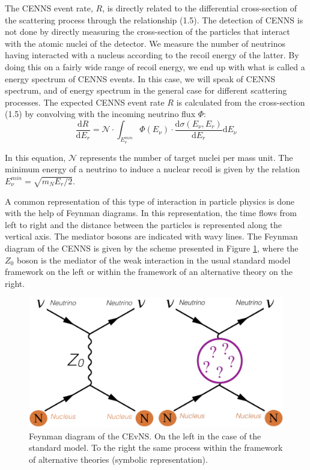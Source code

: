 The CENNS event rate, $R$, is directly related to the differential cross-section of the scattering process through the relationship (1.5). The detection of CENNS is not done by directly measuring the cross-section of the particles that interact with the atomic nuclei of the detector. We measure the number of neutrinos having interacted with a nucleus according to the recoil energy of the latter. By doing this on a fairly wide range of recoil energy, we end up with what is called a energy spectrum of CENNS events. In this case, we will speak of CENNS spectrum, and of energy spectrum in the general case for different scattering processes. The expected CENNS event rate $R$ is calculated from the cross-section (1.5) by convolving with the incoming neutrino flux $\Phi$:
\begin{equation}
\frac{\mathrm{d} R}{\mathrm{d} E_r}
=
\mathcal{N} \cdot
\int_{E_{\nu}^{min}}
\Phi(E_{\nu})
\cdot
\frac{\mathrm{d} \sigma (E_{\nu}, E_r) }{\mathrm{d} E_r} \mathrm{d} E_{\nu}
\end{equation}

In this equation, $\mathcal{N}$ represents the number of target nuclei per mass unit. The minimum energy of a neutrino to induce a nuclear recoil is given by the relation $E_{\nu}^{min}= \sqrt{m_N E_r /2}$.

A common representation of this type of interaction in particle physics is done with the help of Feynman diagrams. In this representation, the time flows from left to right and the distance between the particles is represented along the vertical axis. The mediator bosons are indicated with wavy lines. The Feynman diagram of the CENNS is given by the scheme presented in Figure \ref{fig:cenns-feynman}, where the $Z_0$ boson is the mediator of the weak interaction in the usual standard model framework on the left or within the framework of an alternative theory on the right.

\begin{figure}
\centering
\includegraphics [scale=1]{Figures/Introduction/cenns_feynman.png}
\caption{Feynman diagram of the CEvNS. On the left in the case of the standard model. To the right
the same process within the framework of alternative theories (symbolic representation).}
\label{fig:cenns-feynman}
\end{figure}


